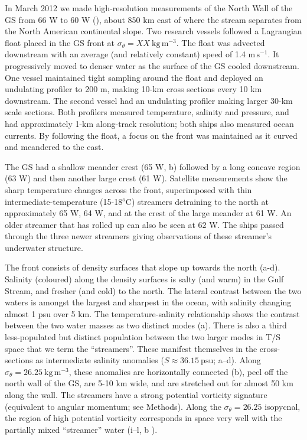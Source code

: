 \documentclass{natureJMK}
\begin{document}
In March 2012 we made high-resolution measurements of the North Wall of the GS from 66 W to 60 W (), about 850 km east of where the stream separates from the North American continental slope.  Two research vessels followed a Lagrangian float placed in the GS front at $\sigma_{\theta}=XX\ \mathrm{kg\,m^{-3}}$.  The float was advected downstream with an average (and relatively constant) speed of 1.4 $\mathrm{m\,s^{-1}}$. It progressively moved to denser water as the surface of the GS cooled downstream.  One vessel maintained  tight sampling around the float and deployed an undulating profiler to 200 m, making 10-km cross sections every 10 km downstream.  The second vessel  had an undulating profiler making larger 30-km  scale sections.  Both profilers measured temperature, salinity and pressure, and had approximately 1-km along-track resolution; both ships also measured ocean currents.  By following the float, a focus on the front was maintained as it curved and meandered to the east.  

The GS had a shallow meander crest (65 W, b)  followed by a long concave region (63 W) and then another large  crest (61 W).  Satellite measurements show the sharp temperature changes across the front, superimposed with thin intermediate-temperature (15-18$^o$C) streamers detraining to the north at approximately 65 W, 64 W, and at the crest of the large meander at 61 W.  An older streamer that has rolled up can also be seen at 62 W.  The ships passed through the three newer streamers giving observations of these streamer's underwater structure.  

The front consists of density surfaces that slope up towards the north (a-d).  Salinity (coloured) along the density surfaces is salty (and warm) in the Gulf Stream, and fresher (and cold) to the north.  The lateral contrast between the two waters is amongst the largest and sharpest in the ocean, with salinity changing almost 1 psu over 5 km.  The temperature-salinity relationship shows the contrast between the two water masses as two distinct modes (a).  There is also a third less-populated but distinct population between the two larger modes in T/S space that we term the ``streamers''.  These manifest themselves in the cross-sections as intermediate salinity anomalies ($S \approx 36.15\ \mathrm{psu}$; a--d).  Along $\sigma_{\theta}=26.25\ \mathrm{kg\,m^{-3}}$, these anomalies are horizontally connected (b), peel off the north wall of the GS, are 5-10 km wide, and are stretched out for almost 50 km along the wall. The streamers have a strong potential vorticity signature (equivalent to angular momentum; see Methods).  Along the $\sigma_{\theta} = 26.25$ isopycnal, the region of high potential vorticity corresponds in space very well with the partially mixed ``streamer'' water (i--l, b ).   
\end{document}
